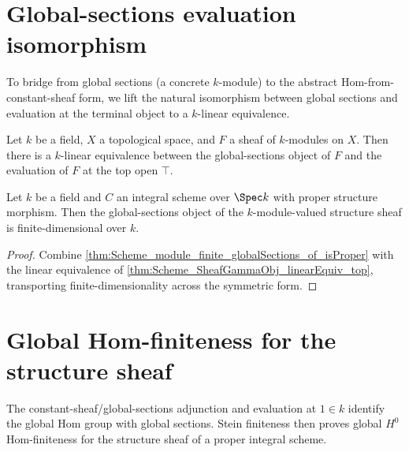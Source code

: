 \section{Global-sections evaluation isomorphism}
\label{sec:gammaObj_linearEquiv_top}

To bridge from global sections (a concrete \(k\)-module) to the abstract Hom-from-constant-sheaf form, we lift the natural isomorphism between global sections and evaluation at the terminal object to a \(k\)-linear equivalence.

\begin{theorem}\leanok
  \label{thm:Scheme_SheafGammaObj_linearEquiv_top}

  Let \(k\) be a field, \(X\) a topological space, and \(F\) a sheaf of \(k\)-modules on \(X\). Then there is a \(k\)-linear equivalence between the global-sections object of \(F\) and the evaluation of \(F\) at the top open \(\top\).
\end{theorem}

\begin{theorem}\leanok
  \label{thm:Scheme_module_finite_gammaObj_of_isProper}
  Let \(k\) be a field and \(C\) an integral scheme over \(\Spec k\) with proper structure morphism. Then the global-sections object of the \(k\)-module-valued structure sheaf is finite-dimensional over \(k\).
\end{theorem}

\begin{proof}

  \leanok
  Combine \cref{thm:Scheme_module_finite_globalSections_of_isProper} with the linear equivalence of \cref{thm:Scheme_SheafGammaObj_linearEquiv_top}, transporting finite-dimensionality across the symmetric form.
\end{proof}

\section{Global Hom-finiteness for the structure sheaf}
\label{sec:IsHModuleHomFinite_producer}

The constant-sheaf/global-sections adjunction and evaluation at \(1\in k\) identify the global Hom group with global sections. Stein finiteness then proves global \(H^0\) Hom-finiteness for the structure sheaf of a proper integral scheme.

